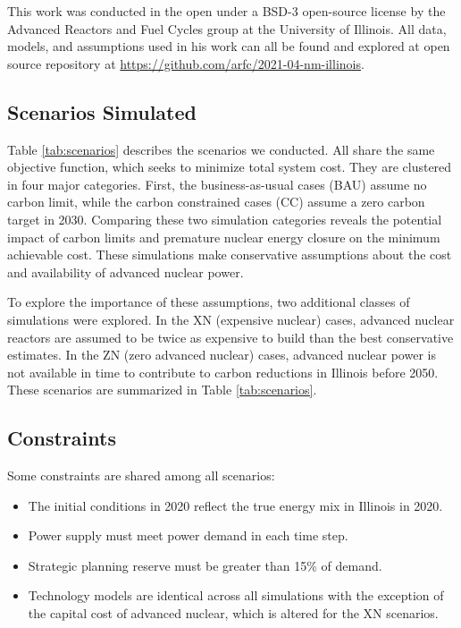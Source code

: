 This work was conducted in the open under a BSD-3 open-source license by the 
Advanced Reactors and Fuel Cycles group at the University of Illinois. All 
data, models, and assumptions used in his work can all be found and explored at 
open source repository at 
\url{https://github.com/arfc/2021-04-nm-illinois}.

\FloatBarrier
\subsection{Scenarios Simulated}\label{sec:simulations}

Table \ref{tab:scenarios} describes the scenarios we conducted.
All share the same objective function, which seeks to minimize total system cost.
They are clustered in four major categories. First, the business-as-usual cases 
(BAU) assume no carbon limit, while the carbon constrained cases (CC) assume a zero 
carbon target in 2030. Comparing these two simulation categories reveals the 
potential impact of carbon limits and premature nuclear energy closure on 
the minimum achievable cost. These simulations make conservative assumptions 
about the cost and availability of advanced nuclear power. 

To explore the importance of these assumptions, two additional classes of 
simulations were explored. In the XN (expensive nuclear) cases, advanced 
nuclear reactors are assumed to be twice as expensive to build than the best 
conservative estimates. In the ZN (zero advanced nuclear) cases, advanced 
nuclear power is not available in time to contribute to carbon reductions in 
Illinois before 2050. These scenarios are summarized in Table 
\ref{tab:scenarios}. 






\FloatBarrier
\subsection{Constraints}
Some constraints are shared among all scenarios:
\begin{itemize}
        \item The initial conditions in 2020 reflect the true energy mix in Illinois in 2020.
        \item Power supply must meet power demand in each time step.
        \item Strategic planning reserve must be greater than 15\% of demand.
        \item Technology models are identical across all simulations with the exception of the capital cost of advanced nuclear, which is altered for the XN scenarios.  
\end{itemize}

